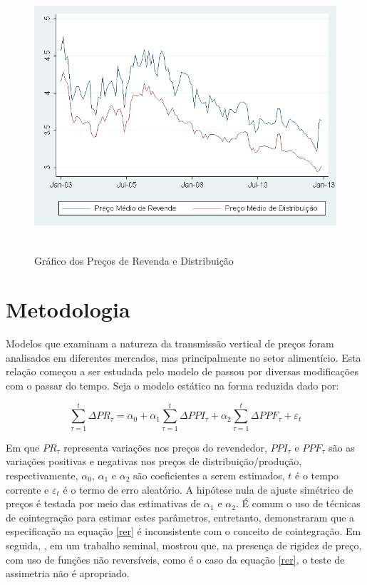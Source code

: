 \documentclass[
	article,			%
	12pt,				%
	openright,			%
	oneside,			%
	a4paper,			%
	english,			%
	brazil				%
	]{abntex2}
\begin{document}
\begin{figure}
    \caption{Gráfico dos Preços de Revenda e Distribuição \label {ker}}
    \centerline{\includegraphics[width=18cm, height=10cm]{precos.png}}
\end{figure}



\section{Metodologia}


Modelos que examinam a natureza da transmissão vertical de preços foram analisados em diferentes mercados, mas principalmente no setor alimentício. Esta relação começou a ser estudada pelo modelo de  passou por diversas modificações com o passar do tempo. Seja o modelo estático na forma reduzida dado por:

\begin{equation} \label{rer}
\sum_{\tau=1}^{t} \Delta PR_{\tau}=\alpha_{0} + \alpha_{1}\sum_{\tau=1}^{t}\Delta PPI_{\tau} + \alpha_{2}\sum_{\tau=1}^{t}\Delta PPF_{\tau} + \varepsilon_{t}
\end{equation}


Em que $PR_{\tau}$ representa variações nos preços do revendedor, $PPI_{\tau}$ e $PPF_{\tau}$ são as variações positivas e negativas nos preços de distribuição/produção, respectivamente, $\alpha_{0}$, $\alpha_{1}$ e $\alpha_{2}$ são coeficientes a serem estimados, $t$ é o tempo corrente e $\varepsilon_{t}$ é o termo de erro aleatório. A hipótese nula de ajuste simétrico de preços é testada por meio das estimativas de $\alpha_{1}$ e $\alpha_{2}$. É comum o uso de técnicas de cointegração para estimar estes parâmetros, entretanto,  demonstraram que a especificação na equação \ref{rer} é inconsistente com o conceito de cointegração. Em seguida, , em um  trabalho seminal, mostrou que, na presença de rigidez de preço, com uso de funções não reversíveis, como é o caso da equação \ref{rer}, o teste de assimetria não é apropriado.
\end{document}
